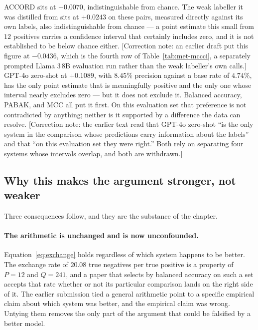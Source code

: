 ACCORD sits at $-0.0070$, indistinguishable from chance. The weak labeller it was
distilled from sits at $+0.0243$ on these pairs, measured directly against its
own labels, also indistinguishable from chance --- a point estimate this small
from $12$ positives carries a confidence interval that certainly includes
zero, and it is not established to be below chance either. [Correction note: an
earlier draft put this figure at $-0.0436$, which is the fourth row of
Table~\ref{tab:met-mccci}, a separately prompted Llama 3\,8B evaluation run
rather than the weak labeller's own calls.] GPT-4o zero-shot at $+0.1089$, with
$8.45\%$ precision against a base rate of $4.74\%$, has the only point estimate
that is meaningfully positive and the only one whose interval nearly excludes
zero --- but it does not exclude it. Balanced accuracy, PABAK, and MCC all put it
first. On this evaluation set that preference is not contradicted by anything;
neither is it supported by a difference the data can resolve. [Correction note:
the earlier text read that GPT-4o zero-shot ``is the only system in the
comparison whose predictions carry information about the labels'' and that ``on
this evaluation set they were right.'' Both rely on separating four systems whose
intervals overlap, and both are withdrawn.]

\subsection{Why this makes the argument stronger, not weaker}

Three consequences follow, and they are the substance of the chapter.

\paragraph{The arithmetic is unchanged and is now unconfounded.}
Equation~\eqref{eq:exchange} holds regardless of which system happens to be
better. The exchange rate of $20.08$ true negatives per true positive is a
property of $P = 12$ and $Q = 241$, and a paper that selects by balanced
accuracy on such a set accepts that rate whether or not its particular
comparison lands on the right side of it. The earlier submission tied a general
arithmetic point to a specific empirical claim about which system was better,
and the empirical claim was wrong. Untying them removes the only part of the
argument that could be falsified by a better model.

